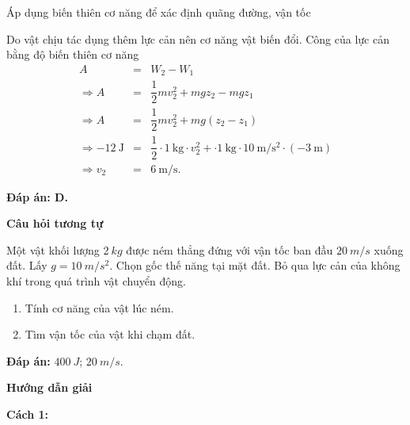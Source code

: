 \begin{dang}{Áp dụng biến thiên cơ năng để xác định quãng đường, vận tốc}
{		Do vật chịu tác dụng thêm lực cản nên cơ năng vật biến đổi. Công của lực cản bằng độ biến thiên cơ năng
		\begin{eqnarray*}
			A&=&W_2-W_1\\
			\Rightarrow A &=& \dfrac{1}{2}mv_2^2+mgz_2 - mgz_1\\
			\Rightarrow A &=& \dfrac{1}{2}mv_2^2+mg(z_2-z_1)\\
			\Rightarrow \SI{-12}{\joule} &=& \dfrac{1}{2}\cdot\SI{1}{\kilogram}\cdot v_2^2 + \cdot\SI{1}{\kilogram}\cdot \SI{10}{\meter/\second^2}\cdot(-\SI{3}{\meter})\\
			\Rightarrow v_2 &=& \SI{6}{\meter/\second}.
		\end{eqnarray*}
		
		\textbf{Đáp án: D.}
		
		\begin{center}
			\textbf{Câu hỏi tương tự}
		\end{center}
		
		Một vật khối lượng $\SI{2}{kg}$ được ném thẳng đứng với vận tốc ban đầu $\SI{20}{m/s}$ xuống đất. Lấy $g=\SI{10}{m/s^2}$. Chọn gốc thế năng tại mặt đất. Bỏ qua lực cản của không khí trong quá trình vật chuyển động.
		\begin{enumerate}[label=\alph*)]
			\item Tính cơ năng của vật lúc ném.
			\item Tìm vận tốc của vật khi chạm đất.
		\end{enumerate}
		
		\textbf{Đáp án:} $\SI{400}{J}$; $\SI{20}{m/s}$.
	}
	{	\begin{center}
			\textbf{Hướng dẫn giải}
		\end{center}
		
		\textbf{Cách 1:}
		
}
\end{dang}
